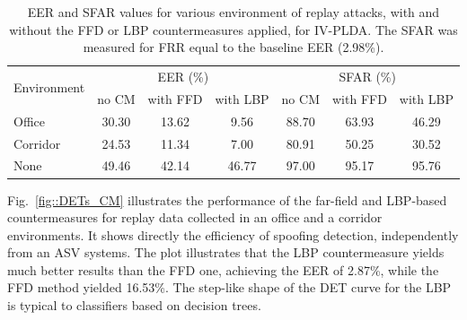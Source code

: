 \begin{table}
\renewcommand{\arraystretch}{1.2}
\begin{center}
    \begin{tabular}{ l || c c c | c c c}
    \hline
 \multirow{2}{*}{Environment}  & \multicolumn{3}{c|}{EER (\%)} & \multicolumn{3}{c}{SFAR (\%)} \\
     	 & no CM & with FFD & with LBP & no CM & with FFD & with LBP\\ 

 \hline \hline
Office   & 30.30 & 13.62 & 9.56 & 88.70 & 63.93 & 46.29\\
Corridor & 24.53 & 11.34 & 7.00 & 80.91 & 50.25 & 30.52\\
None & 49.46 & 42.14 & 46.77 & 97.00 & 95.17 & 95.76\\
\hline
    \end{tabular}
    \caption{EER and SFAR values for various environment of replay attacks, with and without the FFD or LBP countermeasures applied, for IV-PLDA. The SFAR was measured for FRR equal to the baseline EER (2.98\%).}
		\label{tab::results_CM_rooms}
   \end{center}
\end{table}



Fig.~\ref{fig::DETs_CM} illustrates the performance of the far-field and LBP-based countermeasures for replay data collected in an office and a corridor environments. It shows directly the efficiency of spoofing detection, independently from an ASV systems. The plot illustrates that the LBP countermeasure yields much better results than the FFD one, achieving the EER of 2.87\%, while the FFD method yielded 16.53\%. The step-like shape of the DET curve for the LBP is typical to classifiers based on decision trees.

